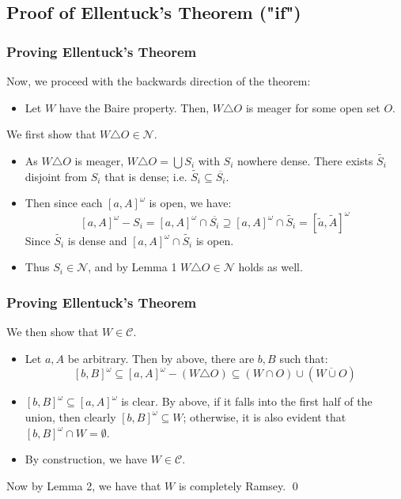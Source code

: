 \documentclass[handout]{beamer}
\begin{document}
\subsection{Proof of Ellentuck's Theorem ("if")}

\begin{frame}
\frametitle{Proving Ellentuck's Theorem}
Now, we proceed with the backwards direction of the theorem: \pause
\begin{itemize}
    \item<2-> Let $W$ have the Baire property. Then, $W\triangle O$ is meager for some open set $O$. 
\end{itemize} \pause
We first show that $W\triangle O\in \mathcal{N}$. \pause
\begin{itemize}
    \item<4-> As $W\triangle O$ is meager, $W\triangle O=\bigcup S_i$ with $S_i$ nowhere dense. There exists $\tilde{S_i}$ disjoint from $S_i$ that is dense; i.e. $\tilde{S_i}\subseteq \overline{S_i}$. 
    \item<5-> Then since each $[a,A]^\omega$ is open, we have:  $$[a,A]^\omega-S_i=[a,A]^\omega\cap\overline{S_i}\supseteq [a,A]^\omega\cap\tilde{S_i}=[\tilde{a},\tilde{A}]^\omega$$
    Since $\tilde{S_i}$ is dense and $[a,A]^\omega\cap\tilde{S_i}$ is open. 
    \item<6-> Thus $S_i\in \mathcal{N}$, and by Lemma 1 $W\triangle O\in \mathcal{N}$ holds as well. 
\end{itemize}
\end{frame}

\begin{frame}
\frametitle{Proving Ellentuck's Theorem}
We then show that $W\in \mathcal{C}$. \pause
\begin{itemize}[<+->]
    \item Let $a,A$ be arbitrary. Then by above, there are $b, B$ such that: 
    $$[b,B]^\omega\subseteq[a,A]^\omega-(W\triangle O) \subseteq (W\cap O)\cup(\overline{W\cup O})$$
    \item $[b,B]^\omega\subseteq[a,A]^\omega$ is clear. By above, if it falls into the first half of the union, then clearly  $[b,B]^\omega\subseteq W$; otherwise, it is also evident that $[b,B]^\omega\cap W=\emptyset$.
    \item By construction, we have $W\in\mathcal{C}$. 
\end{itemize} \pause
Now by Lemma 2, we have that $W$ is completely Ramsey. \qed
\end{frame}
\end{document}
